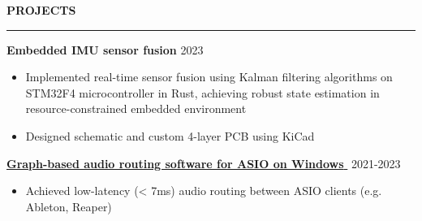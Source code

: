 \documentclass[notitlepage,10pt,a4paper]{article}
\newcommand{\linka}[2]{
   \textcolor{linkb}{\href{#1}{#2}}
}
\newenvironment{resumesection}[1]{
    \header{#1}
}{}
\newcommand{\header}[1]{
    \vspace{2pt}
    \textcolor{accent1}{\Large \textbf{#1}}
    \vspace{6pt}\hrule\vspace{4pt}
}
\newcommand{\TECH}{
    \textcolor{accent3}{\small\textbf{SKILLS}}\small\,
}
\newcommand{\thingsep}{
    \vspace{4pt}
}
\newcommand{\LINK}[2]{
    \href{#1}{\textbf{#2}\,\,{\small\faExternalLink}}
}
\begin{document}
\begin{resumesection}{PROJECTS}
    \raggedright
    \textcolor{accent2}{\textbf{\large Embedded IMU sensor fusion}} \hfill {2023} \\
    {\small\begin{itemize}[noitemsep, font=\small, label={-}, leftmargin=*, topsep=0pt, partopsep=0pt]
        \item Implemented real-time sensor fusion using Kalman filtering algorithms on STM32F4 microcontroller in Rust, achieving robust state estimation in resource-constrained embedded environment
        \item Designed schematic and custom 4-layer PCB using KiCad
    \end{itemize}}
    \thingsep


    \raggedright
    \textcolor{accent2}{\LINK{https://github.com/marisusis/route-suite}{\large Graph-based audio routing software for ASIO on Windows}} \hfill {2021-2023} \\
    {\small\begin{itemize}[noitemsep, font=\small, label={-}, leftmargin=*, topsep=0pt, partopsep=0pt]
        \item Achieved low-latency (< 7ms) audio routing between ASIO clients (e.g. Ableton, Reaper)
    \end{itemize}}
    \thingsep


\end{resumesection}
\end{document}
